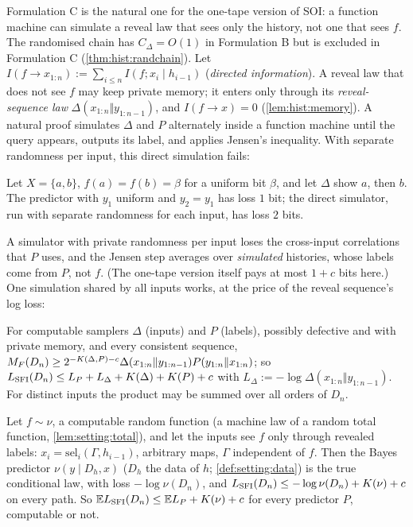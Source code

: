 Formulation C is the natural one for the one-tape version of SOI: a function machine can simulate a reveal law that sees only the history, not one that sees $f$. The randomised chain has $C_\Delta=O(1)$ in Formulation B but is excluded in Formulation C (\cref{thm:hist:randchain}). Let $I(f\to x_{1:n}):=\sum_{i\le n}I(f;x_i\mid h_{i-1})$ (\emph{directed information}). A reveal law that does not see $f$ may keep private memory; it enters only through its \emph{reveal-sequence law} $\Delta(x_{1:n}\Vert y_{1:n-1})$, and $I(f\to x)=0$ (\cref{lem:hist:memory}). A natural proof simulates $\Delta$ and $P$ alternately inside a function machine until the query appears, outputs its label, and applies Jensen's inequality. With separate randomness per input, this direct simulation fails:

\begin{proposition}\label{prop:hist:sketchfails}
Let $X=\{a,b\}$, $f(a)=f(b)=\beta$ for a uniform bit $\beta$, and let $\Delta$ show $a$, then $b$. The predictor with $y_1$ uniform and $y_2=y_1$ has loss $1$ bit; the direct simulator, run with separate randomness for each input, has loss $2$ bits.
\end{proposition}

A simulator with private randomness per input loses the cross-input correlations that $P$ uses, and the Jensen step averages over \emph{simulated} histories, whose labels come from $P$, not $f$. (The one-tape version itself pays at most $1+c$ bits here.) One simulation shared by all inputs works, at the price of the reveal sequence's log loss:

\begin{theorem}\label{thm:hist:shared}
For computable samplers $\Delta$ (inputs) and $P$ (labels), possibly defective and with private memory, and every consistent sequence, $M_{F}(D_n)\ge2^{-K(\Delta,P)-c}\Delta(x_{1:n}\Vert y_{1:n-1})P(y_{1:n}\Vert x_{1:n})$; so $L_{\mathrm{SFI}}(D_n)\le L_P+L_\Delta+K(\Delta)+K(P)+c$ with $L_\Delta:=-\log\Delta(x_{1:n}\Vert y_{1:n-1})$. For distinct inputs the product may be summed over all orders of $D_n$.
\end{theorem}

\begin{theorem}\label{thm:hist:bayes}
Let $f\sim\nu$, a computable random function (a machine law of a random total function, \cref{lem:setting:total}), and let the inputs see $f$ only through revealed labels: $x_i=\mathrm{sel}_i(\Gamma,h_{i-1})$, arbitrary maps, $\Gamma$ independent of $f$. Then the Bayes predictor $\nu(y\mid D_h,x)$ ($D_h$ the data of $h$; \cref{def:setting:data}) is the true conditional law, with loss $-\log\nu(D_n)$, and $L_{\mathrm{SFI}}(D_n)\le-\log\nu(D_n)+K(\nu)+c$ on every path. So $\mathbb{E}L_{\mathrm{SFI}}(D_n)\le\mathbb{E} L_P+K(\nu)+c$ for every predictor $P$, computable or not.
\end{theorem}


